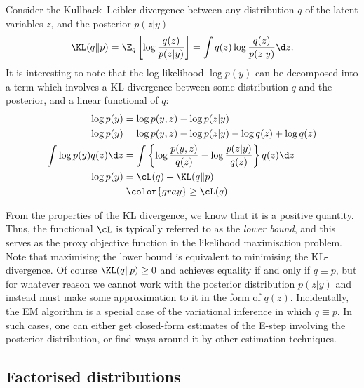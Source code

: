 Consider the Kullback–Leibler divergence between any distribution $q$ of the latent variables $z$, and the posterior $p(z|y)$
\[
  \KL(q \Vert p) = \E_q \left[ \log \frac{q(z)}{p(z|y)} \right]
  = \int q(z) \log \frac{q(z)}{p(z|y)} \d z.
\]
It is interesting to note that the log-likelihood $\log p(y)$ can be decomposed into a term which involves a KL divergence between some distribution $q$ and the posterior, and a linear functional of $q$:
\begin{align*}
  \log p(y) &= \log p(y,z) - \log p(z|y) \\
  \log p(y) &= \log p(y,z) - \log p(z|y) - \log q(z) + \log q(z) \\
  \int \log p(y) q(z) \d z&= \int \left\{ \log \frac{p(y,z)}{q(z)} - \log \frac{p(z|y)}{q(z)} \right\} q(z) \d z \\
  \log p(y) &= \cL(q) + \KL(q \Vert p) \\  
  &\phantom{.}{\color{gray} \geq \cL(q)}
\end{align*}

From the properties of the KL divergence, we know that it is a positive quantity. Thus, the functional $\cL$ is typically referred to as the \emph{lower bound}, and this serves as the proxy objective function in the likelihood maximisation problem. Note that maximising the lower bound is equivalent to minimising the KL-divergence. Of course $\KL(q \Vert p) \geq 0$ and achieves equality if and only if $q \equiv p$, but for whatever reason we cannot work with the posterior distribution $p(z|y)$ and instead must make some approximation to it in the form of $q(z)$. Incidentally, the EM algorithm is a special case of the variational inference in which $q \equiv p$. In such cases, one can either get closed-form estimates of the E-step involving the posterior distribution, or find ways around it by other estimation techniques.

\subsection{Factorised distributions}


